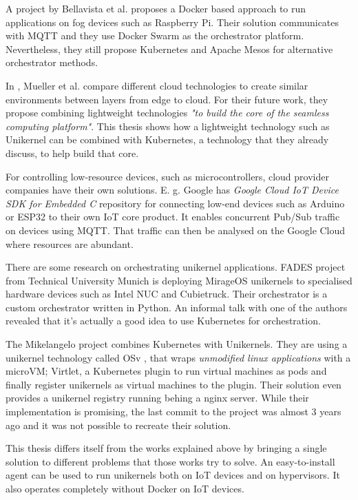 A project by Bellavista et al. \cite{Bellavista2017} proposes a Docker based approach to run applications on fog devices such as Raspberry Pi. Their solution communicates with MQTT and they use Docker Swarm as the orchestrator platform. Nevertheless, they still propose Kubernetes and Apache Mesos for alternative orchestrator methods.

In \cite{Mueller2017}, Mueller et al. compare different cloud technologies to create similar environments between layers from edge to cloud. For their future work, they propose combining lightweight technologies \textit{"to build the core of the seamless computing platform"}. This thesis shows how a lightweight technology such as Unikernel can be combined with Kubernetes, a technology that they already discuss, to help build that core.

For controlling low-resource devices, such as microcontrollers, cloud provider companies have their own solutions. E. g. Google has \textit{Google Cloud IoT Device SDK for Embedded C} repository for connecting low-end devices such as Arduino or ESP32 to their own IoT core product. It enables concurrent Pub/Sub traffic on devices using MQTT. That traffic can then be analysed on the Google Cloud where resources are abundant.

There are some research on orchestrating unikernel applications. FADES project \cite{fades} from Technical University Munich is deploying MirageOS unikernels to specialised hardware devices such as Intel NUC and Cubietruck. Their orchestrator is a custom orchestrator written in Python. An informal talk with one of the authors revealed that it's actually a good idea to use Kubernetes for orchestration.

The Mikelangelo project \cite{Struckmann2018} combines Kubernetes with Unikernels. They are using a unikernel technology called OSv \cite{osv}, that wraps \textit{unmodified linux applications} with a microVM; Virtlet, a Kubernetes plugin to run virtual machines as pods and finally register unikernels as virtual machines to the plugin. Their solution even provides a unikernel registry running behing a nginx server. While their implementation is promising, the last commit to the project was almost 3 years ago and it was not possible to recreate their solution.

This thesis differs itself from the works explained above by bringing a single solution to different problems that those works try to solve. An easy-to-install agent can be used to run unikernels both on IoT devices and on hypervisors. It also operates completely without Docker on IoT devices.